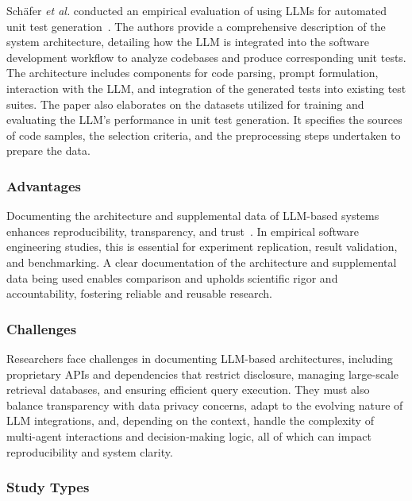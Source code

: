 Sch{\"{a}}fer \textit{et al.} conducted an empirical evaluation of using LLMs for automated unit test generation~\cite{DBLP:journals/tse/SchaferNET24}. The authors provide a comprehensive description of the system architecture, detailing how the LLM is integrated into the software development workflow to analyze codebases and produce corresponding unit tests. The architecture includes components for code parsing, prompt formulation, interaction with the LLM, and integration of the generated tests into existing test suites. The paper also elaborates on the datasets utilized for training and evaluating the LLM's performance in unit test generation. It specifies the sources of code samples, the selection criteria, and the preprocessing steps undertaken to prepare the data.



\subsubsection{Advantages}

Documenting the architecture and supplemental data of LLM-based systems enhances reproducibility, transparency, and trust~\cite{DBLP:journals/software/LuZXXW24}. In empirical software engineering studies, this is essential for experiment replication, result validation, and benchmarking. A clear documentation of the architecture and supplemental data being used enables comparison and upholds scientific rigor and accountability, fostering reliable and reusable research.

\subsubsection{Challenges}

Researchers face challenges in documenting LLM-based architectures, including proprietary APIs and dependencies that restrict disclosure, managing large-scale retrieval databases, and ensuring efficient query execution. They must also balance transparency with data privacy concerns, adapt to the evolving nature of LLM integrations, and, depending on the context, handle the complexity of multi-agent interactions and decision-making logic, all of which can impact reproducibility and system clarity.

\subsubsection{Study Types}

